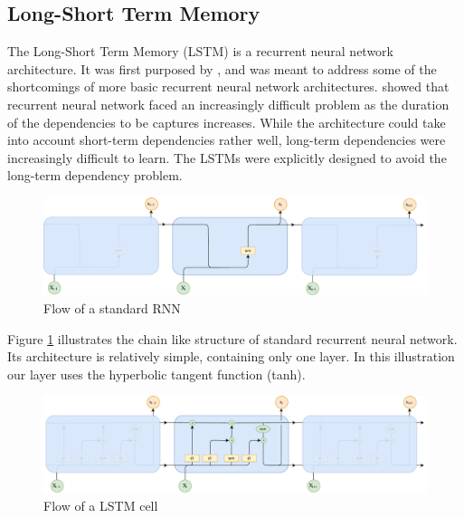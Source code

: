 \subsection{Long-Short Term Memory}
The Long-Short Term Memory (LSTM) is a recurrent neural network architecture. It was first purposed by \citep{hochreiter1997long}, and was meant to address some of the shortcomings of more basic recurrent neural network architectures. \citep{bengio1994learning} showed that recurrent neural network faced an increasingly difficult problem as the duration of the dependencies to be captures increases. While the architecture could take into account short-term dependencies rather well, long-term dependencies were increasingly difficult to learn. The LSTMs were explicitly designed to avoid the long-term dependency problem. 

\begin{figure}[ht]
    \centering
    \includegraphics[width=1\textwidth]{fig/related_work/rnn_flow.pdf}
    \caption{Flow of a standard RNN}
    \label{fig:nn-rnn-flow}
\end{figure}

Figure \ref{fig:nn-rnn-flow} illustrates the chain like structure of standard recurrent neural network. Its architecture is relatively simple, containing only one layer. In this illustration our layer uses the hyperbolic tangent function (tanh).

\begin{figure}[ht]
    \centering
    \includegraphics[width=1\textwidth]{fig/related_work/lstm_flow.pdf}
    \caption{Flow of a LSTM cell}
    \label{fig:nn-lstm-flow}
\end{figure}

